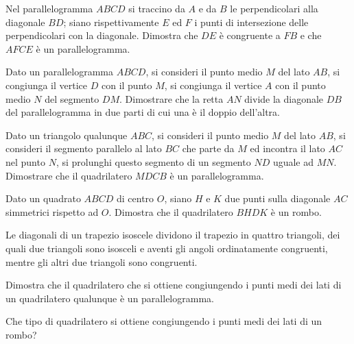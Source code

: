 \begin{multicols}{2}
\begin{esercizio}
\label{ese:4.44}
Nel parallelogramma $ABCD$ si traccino da $A$ e da $B$ le perpendicolari alla diagonale $BD$; siano rispettivamente $E$ ed $F$ i punti di intersezione delle perpendicolari con la diagonale. Dimostra che $DE$ è congruente a $FB$ e che $AFCE$ è un parallelogramma.
\end{esercizio}

\begin{esercizio}
\label{ese:4.45}
Dato un parallelogramma $ABCD$, si consideri il punto medio $M$ del lato $AB$, si congiunga il vertice $D$ con il punto $M$, si congiunga il vertice $A$ con il punto medio $N$ del segmento $DM$. Dimostrare che la retta $AN$ divide la diagonale $DB$ del parallelogramma in due parti di cui una è il doppio dell'altra.	
\end{esercizio}

\begin{esercizio}
\label{ese:4.46}
Dato un triangolo qualunque $ABC$, si consideri il punto medio $M$ del lato $AB$, si consideri il segmento parallelo al lato $BC$ che parte da $M$ ed incontra il lato $AC$ nel punto $N$, si prolunghi questo segmento di un segmento $ND$ uguale ad $MN$. Dimostrare che il quadrilatero $MDCB$ è un parallelogramma.
\end{esercizio}

\begin{esercizio}
\label{ese:4.47}
Dato un quadrato $ABCD$ di centro $O$, siano $H$ e $K$ due punti sulla diagonale $AC$ simmetrici rispetto ad $O$. Dimostra che il quadrilatero $BHDK$ è un rombo.
\end{esercizio}

\begin{esercizio}
\label{ese:4.48}
Le diagonali di un trapezio isoscele dividono il trapezio in quattro triangoli, dei quali due triangoli sono isosceli e aventi gli angoli ordinatamente congruenti, mentre gli altri due triangoli sono congruenti.
\end{esercizio}

\begin{esercizio}
\label{ese:4.49}
Dimostra che il quadrilatero che si ottiene congiungendo i punti medi dei lati di un quadrilatero qualunque è un parallelogramma.
\end{esercizio}

\begin{esercizio}
\label{ese:4.50}
Che tipo di quadrilatero si ottiene congiungendo i punti medi dei lati di un rombo?
\end{esercizio}


\end{multicols}
